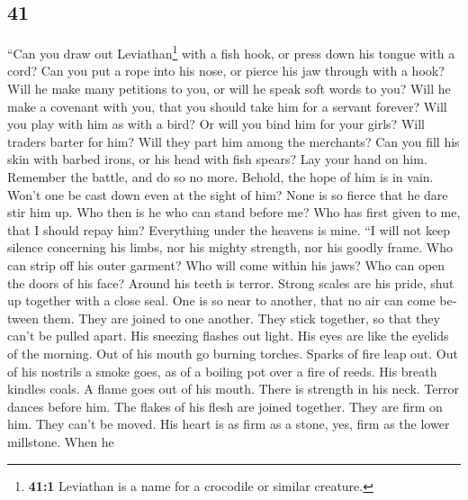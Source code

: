 \begin{paracol}{2}
\switchcolumn
\begin{otherlanguage}{english}

\hypertarget{section-81}{%
\section{41}\label{section-81}}

 ``Can you draw out Leviathan\footnote{\textbf{41:1}
  Leviathan is a name for a crocodile or similar creature.} with a fish
hook, or press down his tongue with a cord?  Can you put a
rope into his nose, or pierce his jaw through with a hook?
 Will he make many petitions to you, or will he speak soft
words to you?  Will he make a covenant with you, that you
should take him for a servant forever?  Will you play with
him as with a bird? Or will you bind him for your girls? 
Will traders barter for him? Will they part him among the merchants?
 Can you fill his skin with barbed irons, or his head with
fish spears?  Lay your hand on him. Remember the battle,
and do so no more.  Behold, the hope of him is in vain.
Won't one be cast down even at the sight of him?  None is
so fierce that he dare stir him up. Who then is he who can stand before
me?  Who has first given to me, that I should repay him?
Everything under the heavens is mine.  ``I will not keep
silence concerning his limbs, nor his mighty strength, nor his goodly
frame.  Who can strip off his outer garment? Who will
come within his jaws?  Who can open the doors of his
face? Around his teeth is terror.  Strong scales are his
pride, shut up together with a close seal.  One is so
near to another, that no air can come between them.  They
are joined to one another. They stick together, so that they can't be
pulled apart.  His sneezing flashes out light. His eyes
are like the eyelids of the morning.  Out of his mouth go
burning torches. Sparks of fire leap out.  Out of his
nostrils a smoke goes, as of a boiling pot over a fire of reeds.
 His breath kindles coals. A flame goes out of his mouth.
 There is strength in his neck. Terror dances before him.
 The flakes of his flesh are joined together. They are
firm on him. They can't be moved.  His heart is as firm
as a stone, yes, firm as the lower millstone.  When he

\end{otherlanguage}
\end{paracol}
